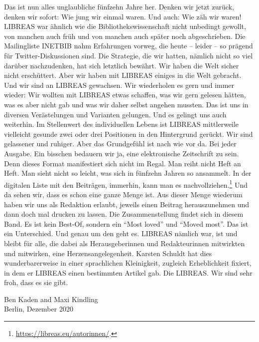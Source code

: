 Das ist nun alles unglaubliche fünfzehn Jahre her. Denken wir jetzt
zurück, denken wir sofort: Wie jung wir einmal waren. Und auch: Wie zäh
wir waren! LIBREAS war ähnlich wie die Bibliothekswissenschaft nicht
unbedingt gewollt, von manchen auch früh und von manchen auch später
noch abgeschrieben. Die Mailingliste INETBIB nahm Erfahrungen vorweg,
die heute -- leider -- so prägend für Twitter-Diskussionen sind. Die
Strategie, die wir hatten, nämlich nicht so viel darüber nachzudenken,
hat sich letztlich bewährt. Wir haben die Welt sicher nicht erschüttert.
Aber wir haben mit LIBREAS einiges in die Welt gebracht. Und wir sind an
LIBREAS gewachsen. Wir wiederholen es gern und immer wieder: Wir wollten
mit LIBREAS etwas schaffen, was wir gern gelesen hätten, was es aber
nicht gab und was wir daher selbst angehen mussten. Das ist uns in
diversen Verästelungen und Varianten gelungen. Und es gelingt uns auch
weiterhin. Im Stellenwert des individuellen Lebens ist LIBREAS
mittlerweile vielleicht gesunde zwei oder drei Positionen in den
Hintergrund gerückt. Wir sind gelassener und ruhiger. Aber das
Grundgefühl ist nach wie vor da. Bei jeder Ausgabe. Ein bisschen
bedauern wir ja, eine elektronische Zeitschrift zu sein. Denn dieses
Format manifestiert sich nicht im Regal. Man reiht nicht Heft an Heft.
Man sieht nicht so leicht, was sich in fünfzehn Jahren so ansammelt. In
der digitalen Liste mit den Beiträgen, immerhin, kann man es
nachvollziehen.\footnote{\url{https://libreas.eu/autorinnen/}.} Und da
sehen wir, dass es schon eine ganze Menge ist. Aus dieser Menge wiederum
haben wir uns als Redaktion erlaubt, jeweils einen Beitrag
herauszunehmen und dann doch mal drucken zu lassen. Die Zusammenstellung
findet sich in diesem Band. Es ist kein Best-Of, sondern ein
\enquote{Most loved} und \enquote{Moved most}. Das ist ein Unterschied.
Und genau um den geht es. LIBREAS nämlich war, ist und bleibt für alle,
die dabei als Herausgeberinnen und Redakteurinnen mitwirkten und
mitwirken, eine Herzensangelegenheit. Karsten Schuldt hat dies
wunderbarerweise in einer sprachlichen Kleinigkeit, zugleich
Erheblichkeit fixiert, in dem er LIBREAS einen bestimmten Artikel gab.
Die LIBREAS. Wir sind sehr froh, dass es sie gibt.

\begin{flushright}
Ben Kaden and Maxi Kindling\\
Berlin, Dezember 2020
\end{flushright}



